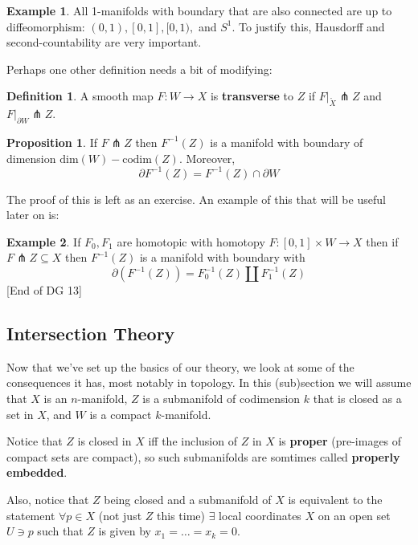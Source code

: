 \documentclass{article}
\theoremstyle{definition}
\newtheorem{definition}{Definition}
\newtheorem{proposition}{Proposition}
\newtheorem{example}{Example}
\begin{document}
\begin{example}
All 1-manifolds with boundary that are also connected are up to diffeomorphism:
$(0, 1), [0, 1], [0, 1), $ and $S^1$. To justify this, Hausdorff and
second-countability are very important. 
\end{example}

Perhaps one other definition needs a bit of modifying:

\begin{definition}
  A smooth map $F : W \to X$ is \textbf{transverse} to $Z$ if $F|_{\mathring{X}}
  \pitchfork Z$ and $F|_{\partial W} \pitchfork Z$.
\end{definition}

\begin{proposition}
  If $F \pitchfork Z$ then $F^{-1}(Z)$ is a manifold with boundary of
  dimension $\text{dim}(W) - \text{codim}(Z)$. Moreover,
  $$ \partial F^{-1}(Z) = F^{-1}(Z) \cap \partial W $$
\end{proposition}

The proof of this is left as an exercise. An example of this that will be useful
later on is:

\begin{example}
  If $F_0, F_1$ are homotopic with homotopy $F: [0, 1] \times W \to X$ then if
  $F \pitchfork Z \subseteq X$ then $F^{-1}(Z)$ is a manifold with boundary with
  $$ \partial(F^{-1}(Z)) = F_0^{-1}(Z) \coprod F_1^{-1}(Z) $$
  [End of DG 13]
\end{example}

\subsection{Intersection Theory}

Now that we've set up the basics of our theory, we look at some of the
consequences it has, most notably in topology. In this (sub)section we will
assume that $X$ is an $n$-manifold, $Z$ is a submanifold of codimension $k$ that
is closed as a set in $X$, and $W$ is a compact $k$-manifold.

Notice that $Z$ is closed in $X$ iff the inclusion of $Z$
in $X$ is \textbf{proper} (pre-images of compact sets are compact), so such submanifolds
are somtimes called \textbf{properly embedded}.

Also, notice that $Z$ being closed and a submanifold of $X$ is equivalent to the
statement $\forall p \in X$ (not just $Z$ this time) $\exists$ local coordinates
$X$ on an open set $U \ni p$ such that $Z$ is given by $x_1 = \dots = x_k = 0$.
\end{document}
